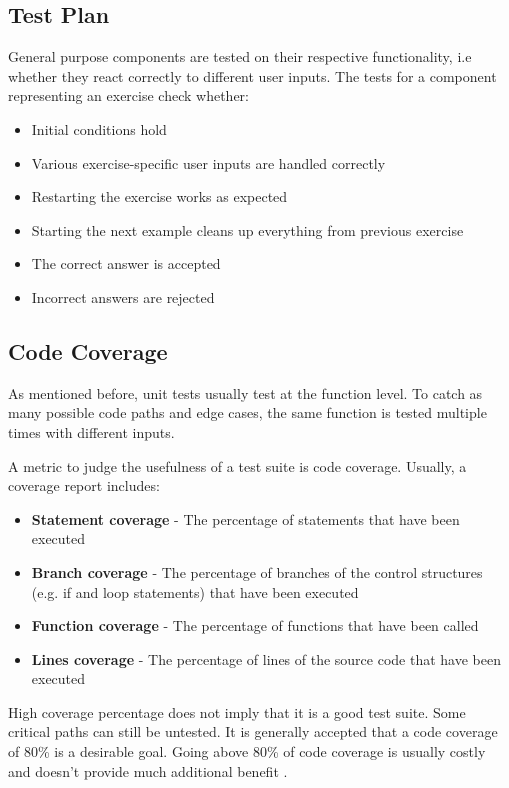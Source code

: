 \subsection*{Test Plan}

General purpose components are tested on their respective functionality, i.e whether they react correctly to different user inputs. The tests for a component representing an exercise check whether:

\begin{itemize}
    \item Initial conditions hold
    \item Various exercise-specific user inputs are handled correctly
    \item Restarting the exercise works as expected
    \item Starting the next example cleans up everything from previous exercise
    \item The correct answer is accepted
    \item Incorrect answers are rejected
\end{itemize}

\subsection*{Code Coverage}
As mentioned before, unit tests usually test at the function level. To catch as many possible code paths and edge cases, the same function is tested multiple times with different inputs. 

A metric to judge the usefulness of a test suite is code coverage. Usually, a coverage report includes:

\begin{itemize}
    \item \textbf{Statement coverage} - The percentage of statements that have been executed 
    \item \textbf{Branch coverage} - The percentage of branches of the control structures (e.g. if and loop statements) that have been executed
    \item \textbf{Function coverage} - The percentage of functions that have been called
    \item \textbf{Lines coverage} - The percentage of lines of the source code that have been executed
\end{itemize}

High coverage percentage does not imply that it is a good test suite. Some critical paths can still be untested. It is generally accepted that a code coverage of 80\% is a desirable goal. Going above 80\% of code coverage is usually costly and doesn't provide much additional benefit \cite{CodeCoverage}.

